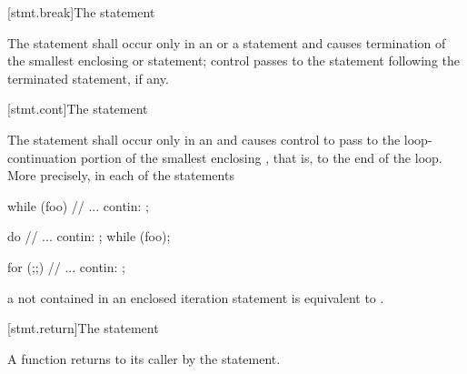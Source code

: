 [stmt.break]{The  statement}%

\pnum
The  statement shall occur only in an
%
%
 or a  statement and causes
termination of the smallest enclosing  or
 statement; control passes to the statement following the
terminated statement, if any.

[stmt.cont]{The  statement}%

\pnum
The
statement shall occur only in an
%
and causes control to pass to the loop-continuation portion of the
smallest enclosing , that is, to the end
of the loop. More precisely, in each of the statements

\begin{minipage}{.30\hsize}
\begin{codeblock}
while (foo) {
  {
    // ...
  }
contin: ;
}
\end{codeblock}
\end{minipage}
\begin{minipage}{.30\hsize}
\begin{codeblock}
do {
  {
    // ...
  }
contin: ;
} while (foo);
\end{codeblock}
\end{minipage}
\begin{minipage}{.30\hsize}
\begin{codeblock}
for (;;) {
  {
    // ...
  }
contin: ;
}
\end{codeblock}
\end{minipage}

a  not contained in an enclosed iteration statement is
equivalent to  .

[stmt.return]{The  statement}%
%
%

\pnum
A function returns to its caller by the  statement.


